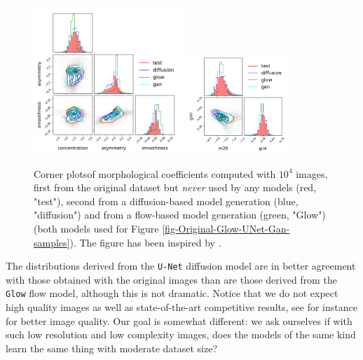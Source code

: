 \documentclass[11pt]{amsart}
\begin{document}
\begin{figure}
    \centering
		\includegraphics[width=0.5\textwidth]{fig-CAS-all.pdf}
		\includegraphics[width=0.35\textwidth]{fig-gini-m20-all.pdf}
	\caption{Corner plots\protect\footnotemark of morphological coefficients computed with $10^4$ images, first from the original dataset but \textit{never} used by any models (red, "test"), second from a diffusion-based model generation (blue, "diffusion") and from a flow-based model generation (green, "Glow") (both models used for Figure \ref{fig-Original-Glow-UNet-Gan-samples}). The figure has been inspired by \cite{HACKSTEIN2023100685}.}
	\label{fig-morpho-coeff}
\end{figure}
The distributions derived from the \texttt{U-Net} diffusion model are in better agreement with those obtained with the original images than are those derived from the \texttt{Glow} flow model, although this is not dramatic.
Notice that we do not expect high quality images as well as state-of-the-art competitive results, see for instance \citep{ravanbakhsh2016,Fussell2019,Lanusse2021,smith2021,HACKSTEIN2023100685} for better image quality. Our goal is somewhat different: we ask ourselves if with such low resolution and low complexity images, does the models of the same kind learn the same thing with moderate dataset size?
%
\end{document}
